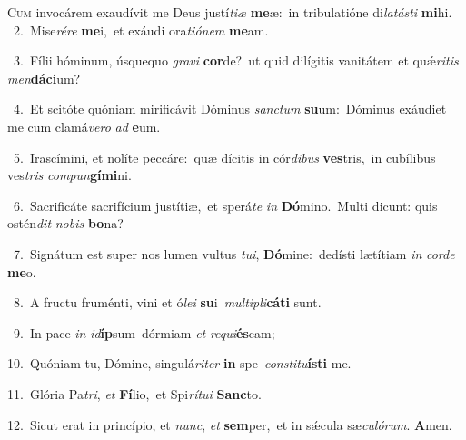 \lettrine{\initial\textcolor{\initialcolor}{C}}{um} invocárem exaudívit me Deus justí\-\textit{ti}\-\textit{æ} \textbf{me}\-æ:~\star in tribulatióne di\-\textit{la}\-\textit{tás}\textit{ti} \textbf{mi}\-hi.\\
{\numbfont\textcolor{\numbcolor}{~2.}}~Mise\-\textit{ré}\-\textit{re} \textbf{me}\-i,~\star et exáudi ora\-\textit{ti}\-\textit{ó}\textit{nem} \textbf{me}\-am.\par
{\numbfont\textcolor{\numbcolor}{~3.}}~Fílii hóminum, úsquequo \textit{gra}\-\textit{vi} \textbf{cor}\-de?~\star ut quid dilígitis vanitátem et quǽ\-\textit{ri}\-\textit{tis} \textit{men}\-\textbf{dá}\textbf{ci}um?\par
{\numbfont\textcolor{\numbcolor}{~4.}}~Et scitóte quóniam mirificávit Dóminus \textit{sanc}\-\textit{tum} \textbf{su}\-um:~\star Dóminus exáudiet me cum clamá\-\textit{ve}\-\textit{ro} \textit{ad} \textbf{e}\-um.\par
{\numbfont\textcolor{\numbcolor}{~5.}}~Irascímini, et nolíte peccáre:~\dagger quæ dícitis in cór\-\textit{di}\-\textit{bus} \textbf{ves}\-tris,~\star in cubílibus ves\textit{tris} \textit{com}\-\textit{pun}\textbf{gí}\textbf{mi}ni.\par
{\numbfont\textcolor{\numbcolor}{~6.}}~Sacrificáte sacrifícium justítiæ,~\dagger et sperá\textit{te} \textit{in} \textbf{Dó}\-mino.~\star Multi dicunt: quis ostén\textit{dit} \textit{no}\-\textit{bis} \textbf{bo}\-na?\par
{\numbfont\textcolor{\numbcolor}{~7.}}~Signátum est super nos lumen vultus \textit{tu}\-\textit{i}, \textbf{Dó}\-mine:~\star dedísti lætítiam \textit{in} \textit{cor}\-\textit{de} \textbf{me}\-o.\par
{\numbfont\textcolor{\numbcolor}{~8.}}~A fructu fruménti, vini et ó\-\textit{le}\-\textit{i} \textbf{su}\-i~\star \textit{mul}\-\textit{ti}\textit{pli}\textbf{cá}\textbf{ti} sunt.\par
{\numbfont\textcolor{\numbcolor}{~9.}}~In pace \textit{in} \textit{id}\-\textbf{íp}sum~\star dórmiam \textit{et} \textit{re}\-\textit{qui}\textbf{és}cam;\par
{\numbfont\textcolor{\numbcolor}{10.}}~Quóniam tu, Dómine, singulá\-\textit{ri}\-\textit{ter} \textbf{in} spe~\star \textit{con}\-\textit{sti}\textit{tu}\textbf{ís}\textbf{ti} me.\par
{\numbfont\textcolor{\numbcolor}{11.}}~Glória Pa\-\textit{tri}\-, \textit{et} \textbf{Fí}\-lio,~\star et Spi\-\textit{rí}\-\textit{tu}\textit{i} \textbf{Sanc}\-to.\par
{\numbfont\textcolor{\numbcolor}{12.}}~Sicut erat in princípio, et \textit{nunc}\-, \textit{et} \textbf{sem}\-per,~\star et in sǽcula sæ\-\textit{cu}\-\textit{ló}\textit{rum}. \textbf{A}\-men.\par
